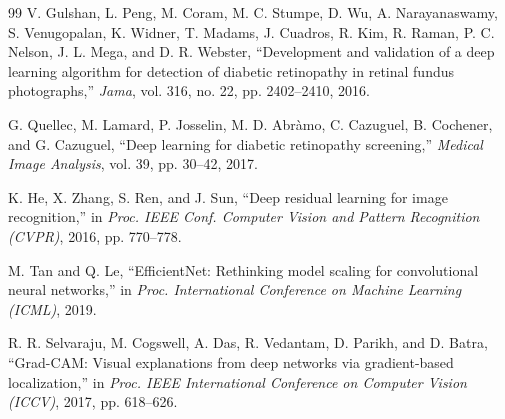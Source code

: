 \documentclass[conference]{IEEEtran}
\begin{document}
\begin{thebibliography}{99}
V. Gulshan, L. Peng, M. Coram, M. C. Stumpe, D. Wu, A. Narayanaswamy, S. Venugopalan, K. Widner, T. Madams, J. Cuadros, R. Kim, R. Raman, P. C. Nelson, J. L. Mega, and D. R. Webster, ``Development and validation of a deep learning algorithm for detection of diabetic retinopathy in retinal fundus photographs,'' \emph{Jama}, vol. 316, no. 22, pp. 2402--2410, 2016.

G. Quellec, M. Lamard, P. Josselin, M. D. Abr\`amo, C. Cazuguel, B. Cochener, and G. Cazuguel, ``Deep learning for diabetic retinopathy screening,'' \emph{Medical Image Analysis}, vol. 39, pp. 30--42, 2017.

K. He, X. Zhang, S. Ren, and J. Sun, ``Deep residual learning for image recognition,'' in \emph{Proc. IEEE Conf. Computer Vision and Pattern Recognition (CVPR)}, 2016, pp. 770--778.

M. Tan and Q. Le, ``EfficientNet: Rethinking model scaling for convolutional neural networks,'' in \emph{Proc. International Conference on Machine Learning (ICML)}, 2019.

R. R. Selvaraju, M. Cogswell, A. Das, R. Vedantam, D. Parikh, and D. Batra, ``Grad-CAM: Visual explanations from deep networks via gradient-based localization,'' in \emph{Proc. IEEE International Conference on Computer Vision (ICCV)}, 2017, pp. 618--626.
\end{thebibliography}
\end{document}
